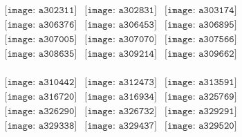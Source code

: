 \documentclass{article}
\begin{document}
        \clearpage
        \begin{figure}[H]
 \begin{center}$
 \begin{array}{cccc}
\texttt{[image: a302311]}&\texttt{[image: a302831]}&\texttt{[image: a303174]}\\\texttt{[image: a306376]}&\texttt{[image: a306453]}&\texttt{[image: a306895]}\\\texttt{[image: a307005]}&\texttt{[image: a307070]}&\texttt{[image: a307566]}\\\texttt{[image: a308635]}&\texttt{[image: a309214]}&\texttt{[image: a309662]}\\
\end{array}$
\end{center}
\end{figure}

\begin{figure}[H]
 \begin{center}$
 \begin{array}{cccc}
\texttt{[image: a310442]}&\texttt{[image: a312473]}&\texttt{[image: a313591]}\\\texttt{[image: a316720]}&\texttt{[image: a316934]}&\texttt{[image: a325769]}\\\texttt{[image: a326290]}&\texttt{[image: a326732]}&\texttt{[image: a329291]}\\\texttt{[image: a329338]}&\texttt{[image: a329437]}&\texttt{[image: a329520]}\\
\end{array}$
\end{center}
\end{figure}
\end{document}
